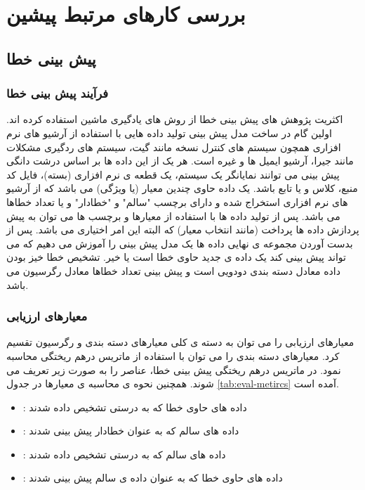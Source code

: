 \section{بررسی کارهای مرتبط پیشین}
\label{sec:survey}

\subsection{پیش بینی خطا}
\subsubsection{فرآیند پیش بینی خطا}
اکثریت پژوهش های پیش بینی خطا از روش های یادگیری ماشین  استفاده کرده اند. اولین گام در ساخت مدل پیش بینی تولید داده هایی با استفاده از آرشیو های نرم افزاری همچون سیستم های کنترل نسخه مانند گیت، سیستم های ردگیری مشکلات  مانند جیرا،  آرشیو ایمیل ها و غیره است. هر یک از این داده ها بر اساس درشت دانگی پیش بینی می توانند نمایانگر یک سیستم، یک قطعه ی نرم افزاری (بسته)، فایل کد منبع، کلاس و یا تابع باشد. یک داده حاوی چندین معیار (یا ویژگی) می باشد که از آرشیو های نرم افزاری استخراج شده و دارای برچسب "سالم" و "خطادار"  و یا تعداد خطاها می باشد. پس از تولید داده ها با استفاده از معیارها و برچسب ها می توان به پیش پردازش داده ها پرداخت (مانند انتخاب معیار) که البته این امر اختیاری می باشد. پس از بدست آوردن مجموعه ی نهایی داده ها یک مدل پیش بینی را آموزش می دهیم که می تواند پیش بینی کند یک داده ی جدید حاوی خطا است یا خیر. تشخیص خطا خیز بودن داده معادل دسته بندی دودویی است و پیش بینی تعداد خطاها معادل رگرسیون می باشد. 
\subsubsection{معیارهای ارزیابی}
معیارهای ارزیابی را می توان به دسته ی کلی  معیارهای دسته بندی و رگرسیون تقسیم کرد.  معیارهای دسته بندی را می توان با استفاده از ماتریس درهم ریختگی محاسبه نمود. در ماتریس درهم ریختگی پیش بینی خطا، عناصر را به صورت زیر تعریف می شوند.  همچنین نحوه ی محاسبه ی معیارها در جدول \ref{tab:eval-metircs} آمده است. 
\begin{itemize}
\item {} : 
داده های حاوی خطا که به درستی تشخیص داده شدند
\item {}: 
  داده های سالم که به عنوان خطادار پیش بینی شدند
\item {}:
داده های سالم که به درستی تشخیص داده شدند
\item {}: 
داده های حاوی خطا که به عنوان داده ی سالم پیش بینی شدند

\end{itemize}


